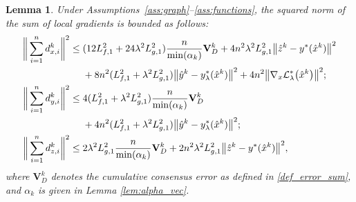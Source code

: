 \documentclass{article}
\theoremstyle{plain}
\newtheorem{lemma}[theorem]{Lemma}
\theoremstyle{definition}
\theoremstyle{remark}
\begin{document}
\begin{lemma}\label{lem:gradient_sum_bound}
   Under Assumptions~\ref{ass:graph}--\ref{ass:functions}, the squared norm of the sum of local gradients is bounded as follows:
    \begin{subequations}
    \begin{align}
        \bigg\|\sum_{i=1}^nd_{x,i}^k\bigg\|^{2} \leq{}& (12 L_{f,1}^{2} + 24 \lambda^{2}L_{g,1}^{2})\frac{n}{\min(\alpha_{k})}\mathbf{V}_{D}^{k} + 4 n^{2}\lambda^{2}L_{g,1}^{2}\big\|\hat{z}^{k}-y^*(\hat{x}^{k})\big\|^{2} \notag \\
        &+ 8n^{2}(L_{f,1}^{2}+\lambda^{2}L_{g,1}^{2})\big\|\hat{y}^{k}-y_{\lambda}^*(\hat{x}^{k})\big\|^{2} + 4n^{2}\big\| \nabla_{x} \mathcal{L}_{\lambda}^{*}\big({\hat{x}}^k\big) \big\|^{2}; \label{eq:dx_bound} \\
        \bigg\|\sum_{i=1}^nd_{y,i}^k\bigg\|^{2} \leq{}& 4( L_{f,1}^{2}+\lambda^{2} L_{g,1}^{2})\frac{n}{\min(\alpha_{k})}\mathbf{V}_{D}^{k} \notag \\
        &+ 4 n^{2} (L_{f,1}^{2}+\lambda^{2} L_{g,1}^{2})\big\|\hat{y}^{k}-y_{\lambda}^*(\hat{x}^{k})\big\|^{2}; \label{eq:dy_bound} \\
        \bigg\|\sum_{i=1}^nd_{z,i}^k\bigg\|^{2} \leq{}& 2 \lambda^{2} L_{g,1}^{2}\frac{n}{\min(\alpha_{k})}\mathbf{V}_{D}^{k} + 2 n^{2}\lambda^{2}L_{g,1}^{2}\big\|\hat{z}^{k}-y^*(\hat{x}^{k})\big\|^{2},\label{eq:dz_bound}
    \end{align}
    \end{subequations}
where $\mathbf{V}_{D}^{k}$ denotes the cumulative consensus error as defined in \eqref{def_error_sum}, and $\alpha_{k}$ is given in Lemma \ref{lem:alpha_vec}.
\end{lemma}
\end{document}
